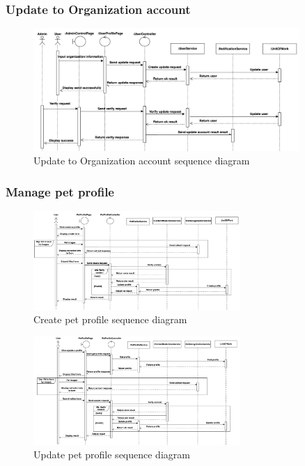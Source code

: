\subsubsection{Update to Organization account}

\begin{figure}[H]
  \centering
  \includegraphics[width=0.9\textwidth]{Figures/update_org_seq.png}
  \caption{Update to Organization account sequence diagram}
  \label{fig:update-org-seq}
\end{figure}

\subsubsection{Manage pet profile}

\begin{figure}[H]
  \centering
  \includegraphics[angle=-90,width=0.7\textwidth]{Figures/manage_pet_seq.png}
  \caption{Create pet profile sequence diagram}
  \label{fig:manage-pet-seq}
\end{figure}
\clearpage
\begin{figure}[H]
  \centering
  \includegraphics[angle=-90,width=0.7\textwidth]{Figures/update_pet_profile_seq.png}
  \caption{Update pet profile sequence diagram}
  \label{fig:access-pet-seq}
\end{figure}
\clearpage

